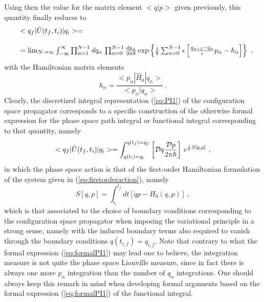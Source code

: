 \documentclass[a4paper,11pt]{article}
\begin{document}
Using then the value for the matrix element $<q|p>$ given previously, 
this quantity finally reduces to
\begin{equation}
\begin{array}{r l}
&<q_f|\hat{U}(t_f,t_i)|q_i>= \\
 & \\
&=\lim_{N\rightarrow\infty}\int_{-\infty}^\infty\prod_{\alpha=1}^{N-1}
dq_\alpha\,\prod_{\alpha=0}^{N-1}\frac{dp_\alpha}{2\pi\hbar}\,
{\rm exp}\left\{\frac{i}{\hbar}\sum_{\alpha=0}^{N-1}\epsilon
\left[\frac{q_{\alpha+1}-q_\alpha}{\epsilon}p_\alpha-h_\alpha\right]\right\}\ ,
\end{array}
\label{eq:PI1}
\end{equation}
with the Hamiltonian matrix elements
\begin{equation}
h_\alpha=\frac{<p_\alpha|\hat{H}_0|q_\alpha>}
{<p_\alpha|q_\alpha>}\ .
\end{equation}
Clearly, the discretized integral representation (\ref{eq:PI1}) of
the configuration space propagator corresponds to a specific construction
of the otherwise formal expression for the phase space path integral
or functional integral corresponding to that quantity, namely
\begin{equation}
<q_f|\hat{U}(t_f,t_i)|q_i>=
\int_{q(t_i)=q_i}^{q(t_f)=q_f}
\left[{\cal D}q\frac{{\cal D}p}{2\pi\hbar}\right]\,
e^{\frac{i}{\hbar}S[q,p]}\ ,
\label{eq:formalPI1}
\end{equation}
in which the phase space action is that of the first-order Hamiltonian 
formulation of the system given in (\ref{eq:firstorderaction}), namely
\begin{equation}
S[q,p]=\int_{t_i}^{t_f}dt\left[\dot{q}p-H_0(q,p)\right]\ ,
\end{equation}
which is that associated to the choice of boundary conditions corresponding
to the configuration space propagator when imposing the variational
principle in a strong sense, namely with the induced boundary terms also
required to vanish through the boundary conditions $q(t_{i,f})=q_{i,f}$. 
Note that contrary to what the formal
expression (\ref{eq:formalPI1}) may lead one to believe, the integration
measure is not quite the phase space Liouville measure, since in fact
there is always one more $p_\alpha$ integration than the number of $q_\alpha$ 
integrations. One should always keep this remark in mind when developing
formal arguments based on the formal expression (\ref{eq:formalPI1})
of the functional integral.
\end{document}
